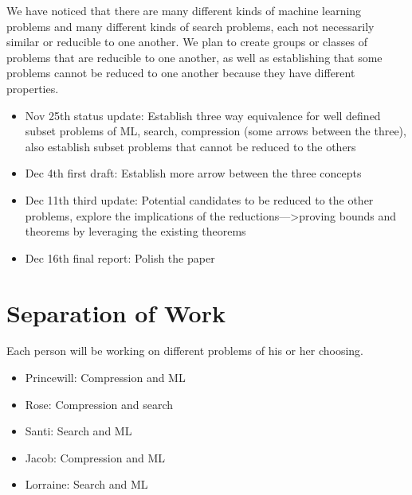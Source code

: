 \documentclass[12pt]{article}
\begin{document}
We have noticed that there are many different kinds of machine learning problems and many different 
kinds of search problems, each not necessarily similar or reducible to one another.
We plan to create groups or classes of problems that are reducible to one another,
as well as establishing that some problems cannot be reduced to one another because 
they have different properties.

\begin{itemize}
\item
Nov 25th status update: Establish three way equivalence for well defined subset problems of ML, search, compression (some arrows between the three), also establish subset problems that cannot be reduced to the others
\item
Dec 4th first draft: Establish more arrow between the three concepts
\item
Dec 11th third update: Potential candidates to be reduced to the other problems, explore the implications of the reductions—>proving bounds and theorems by leveraging the existing theorems
\item
Dec 16th final report:  Polish the paper
\end{itemize}

\section{Separation of Work}

Each person will be working on different problems of his or her choosing.

\begin{itemize}
\item
Princewill: Compression and ML
\item
Rose: Compression and search
\item
Santi: Search and ML
\item
Jacob: Compression and ML
\item
Lorraine: Search and ML
\end{itemize}
\end{document}
